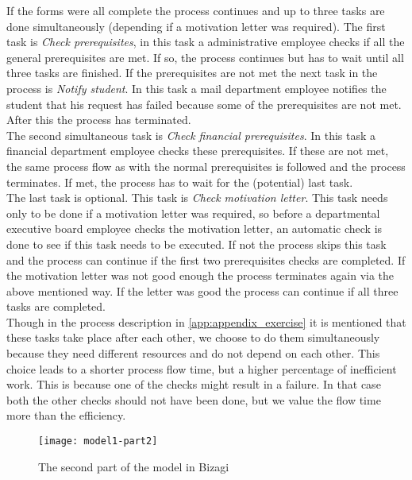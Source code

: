 \noindent If the forms were all complete the process continues and up to three tasks are done simultaneously (depending if a motivation letter was required). The first task is \emph{Check prerequisites}, in this task a administrative employee checks if all the general prerequisites are met. If so, the process continues but has to wait until all three tasks are finished. If the prerequisites are not met the next task in the process is \emph{Notify student}. In this task a mail department employee notifies the student that his request has failed because some of the prerequisites are not met. After this the process has terminated.\\
The second simultaneous task is \emph{Check financial prerequisites}. In this task a financial department employee checks these prerequisites. If these are not met, the same process flow as with the normal prerequisites is followed and the process terminates. If met, the process has to wait for the (potential) last task.\\
The last task is optional. This task is \emph{Check motivation letter}. This task needs only to be done if a motivation letter was required, so before a departmental executive board employee checks the motivation letter, an automatic check is done to see if this task needs to be executed. If not the process skips this task and the process can continue if the first two prerequisites checks are completed. If the motivation letter was not good enough the process terminates again via the above mentioned way. If the letter was good the process can continue if all three tasks are completed.\\
Though in the process description in \autoref{app:appendix_exercise} it is mentioned that these tasks take place after each other, we choose to do them simultaneously because they need different resources and do not depend on each other. This choice leads to a shorter process flow time, but a higher percentage of inefficient work. This is because one of the checks might result in a failure. In that case both the other checks should not have been done, but we value the flow time more than the efficiency.

\begin{figure}[!ht]
\begin{center}
	\texttt{[image: model1-part2]}
	\caption{The second part of the model in Bizagi}
	\label{fig:model1-part2}
\end{center}
\end{figure}

